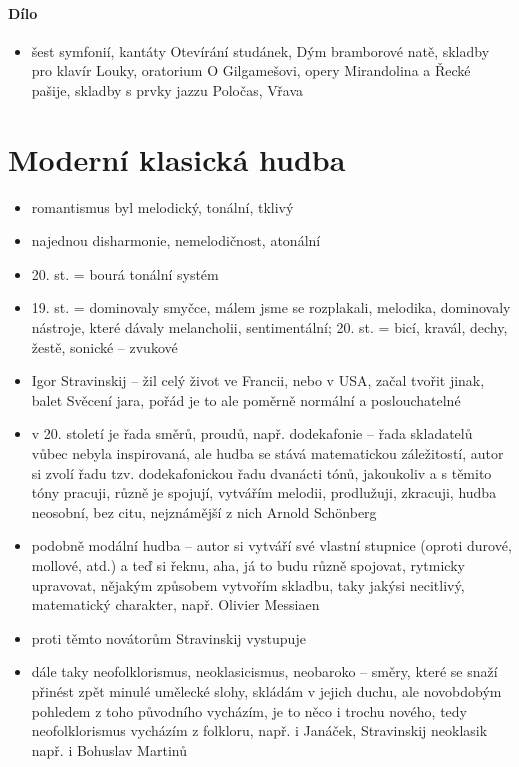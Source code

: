 \documentclass{article}
\begin{document}
\subsection{Dílo}
\begin{itemize}
  \item šest symfonií, kantáty Otevírání studánek, Dým bramborové natě, skladby pro klavír Louky, oratorium O Gilgamešovi, opery Mirandolina a Řecké pašije, skladby s prvky jazzu Poločas, Vřava
\end{itemize}

\part{Moderní klasická hudba}
\begin{itemize}
  \item romantismus byl melodický, tonální, tklivý
  \item najednou disharmonie, nemelodičnost, atonální
  \item 20. st. = bourá tonální systém
  \item 19. st. = dominovaly smyčce, málem jsme se rozplakali, melodika, dominovaly nástroje, které dávaly melancholii, sentimentální; 20. st. = bicí, kravál, dechy, žestě, sonické -- zvukové
  \item Igor Stravinskij -- žil celý život ve Francii, nebo v USA, začal tvořit jinak, balet Svěcení jara, pořád je to ale poměrně normální a poslouchatelné
  \item v 20. století je řada směrů, proudů, např. dodekafonie -- řada skladatelů vůbec nebyla inspirovaná, ale hudba se stává matematickou záležitostí, autor si zvolí řadu tzv. dodekafonickou řadu dvanácti tónů, jakoukoliv a s těmito tóny pracuji, různě je spojují, vytvářím melodii, prodlužuji, zkracuji, hudba neosobní, bez citu, nejznámější z nich Arnold Schönberg
  \item podobně modální hudba -- autor si vytváří své vlastní stupnice (oproti durové, mollové, atd.) a teď si řeknu, aha, já to budu různě spojovat, rytmicky upravovat, nějakým způsobem vytvořím skladbu, taky jakýsi necitlivý, matematický charakter, např. Olivier Messiaen
  \item proti těmto novátorům Stravinskij vystupuje
  \item dále taky neofolklorismus, neoklasicismus, neobaroko -- směry, které se snaží přinést zpět minulé umělecké slohy, skládám v jejich duchu, ale novobdobým pohledem z toho původního vycházím, je to něco i trochu nového, tedy neofolklorismus vycházím z folkloru, např. i Janáček, Stravinskij neoklasik např. i Bohuslav Martinů

\end{itemize}
\end{document}

